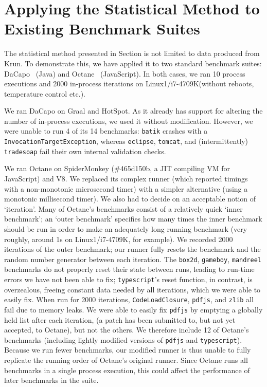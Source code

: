 \documentclass[preprint,numbers,10pt]{sigplanconf}
\newcommand{\bencherthree}{Linux1/i7-4709K\xspace}
\begin{document}
\section{Applying the Statistical Method to Existing Benchmark Suites}
\label{sec:existing}

The statistical method presented in Section  is not limited to data
produced from Krun. To demonstrate this, we have applied it to two standard
benchmark suites: DaCapo~\cite{dacapo06} (Java) and Octane~
(JavaScript). In both cases, we ran 10 process executions and 2000 in-process
iterations on \bencherthree (without reboots, temperature control etc.).

We ran DaCapo on Graal and HotSpot. As it already has support for
altering the number of in-process executions, we used it without modification.
However, we were unable to run 4 of its 14 benchmarks: \texttt{batik}
crashes with a \texttt{InvocationTargetException}, whereas \texttt{eclipse},
\texttt{tomcat}, and (intermittently) \texttt{tradesoap} fail their own internal
validation checks.

We ran Octane on SpiderMonkey (\#465d150b, a JIT compiling VM for JavaScript) and V8.
We replaced its complex runner (which reported timings with a non-monotonic
microsecond timer) with a simpler alternative (using a monotonic millisecond
timer). We also had to decide on an acceptable notion of `iteration'. Many of Octane's
benchmarks consist of a relatively quick `inner benchmark'; an `outer benchmark'
specifies how many times the inner benchmark should be run in order to make an
adequately long running benchmark (very roughly, around 1s on \bencherthree, for
example). We recorded 2000 iterations of the outer benchmark; our runner
fully resets the benchmark and the random number generator between each
iteration. The \texttt{box2d}, \texttt{gameboy}, \texttt{mandreel} benchmarks do
not properly reset their state between runs, leading to run-time errors we have
not been able to fix; \texttt{typescript}'s reset function, in contrast, is
overzealous, freeing constant data needed by all iterations, which we were able
to easily fix. When run for 2000 iterations, \texttt{CodeLoadClosure},
\texttt{pdfjs}, and \texttt{zlib} all fail due to memory leaks. We were able to
easily fix \texttt{pdfjs} by emptying a globally held list after each iteration,
(a patch has been submitted to, but not yet accepted, to Octane), but not the
others. We therefore include 12 of Octane's benchmarks (including lightly
modified versions of \texttt{pdfjs} and \texttt{typescript}).
Because we run fewer benchmarks, our modified runner is thus unable to fully
replicate the running order of Octane's original runner. Since Octane runs all
benchmarks in a single process execution, this could affect the performance of
later benchmarks in the suite.
\end{document}
